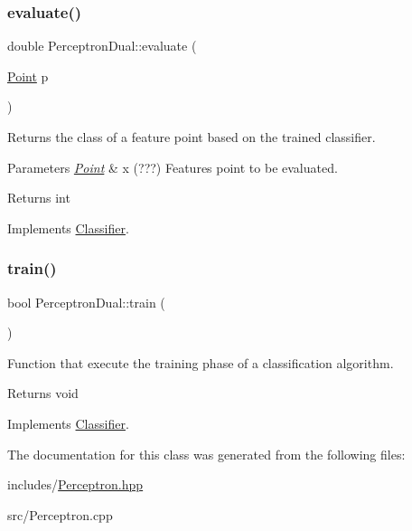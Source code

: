 \subsubsection{\texorpdfstring{evaluate()}{evaluate()}}
{\footnotesize\ttfamily double Perceptron\+Dual\+::evaluate (\begin{DoxyParamCaption}\item[{\hyperlink{class_point}{Point}}]{p }\end{DoxyParamCaption})\hspace{0.3cm}{\ttfamily [virtual]}}



Returns the class of a feature point based on the trained classifier. 


\begin{DoxyParams}{Parameters}
{\em \hyperlink{class_point}{Point}} & x (???) Features point to be evaluated. \\
\hline
\end{DoxyParams}
\begin{DoxyReturn}{Returns}
int 
\end{DoxyReturn}


Implements \hyperlink{class_classifier_ae8e9554823b85ddc2dcad2955da811d9}{Classifier}.

\mbox{\label{class_perceptron_dual_a91b0bd1e86a6003b57b96199266cdc3e}} 
\subsubsection{\texorpdfstring{train()}{train()}}
{\footnotesize\ttfamily bool Perceptron\+Dual\+::train (\begin{DoxyParamCaption}{ }\end{DoxyParamCaption})\hspace{0.3cm}{\ttfamily [virtual]}}



Function that execute the training phase of a classification algorithm. 

\begin{DoxyReturn}{Returns}
void 
\end{DoxyReturn}


Implements \hyperlink{class_classifier_a2306a5de27555ab093593ac9642bc7d9}{Classifier}.



The documentation for this class was generated from the following files\+:\begin{DoxyCompactItemize}
\item 
includes/\hyperlink{_perceptron_8hpp}{Perceptron.\+hpp}\item 
src/Perceptron.\+cpp\end{DoxyCompactItemize}
